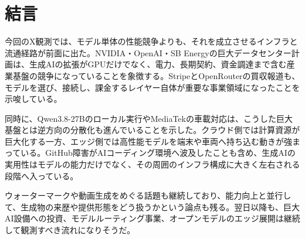 \section{結言}
今回のX観測では、モデル単体の性能競争よりも、それを成立させるインフラと流通経路が前面に出た。NVIDIA・OpenAI・SB Energyの巨大データセンター計画は、生成AIの拡張がGPUだけでなく、電力、長期契約、資金調達まで含む産業基盤の競争になっていることを象徴する。StripeとOpenRouterの買収報道も、モデルを選び、接続し、課金するレイヤー自体が重要な事業領域になったことを示唆している。

同時に、Qwen3.8-27Bのローカル実行やMediaTekの車載対応は、こうした巨大基盤とは逆方向の分散化も進んでいることを示した。クラウド側では計算資源が巨大化する一方、エッジ側では高性能モデルを端末や車両へ持ち込む動きが強まっている。GitHub障害がAIコーディング環境へ波及したことも含め、生成AIの実用性はモデルの能力だけでなく、その周囲のインフラ構成に大きく左右される段階へ入っている。

ウォーターマークや動画生成をめぐる話題も継続しており、能力向上と並行して、生成物の来歴や提供形態をどう扱うかという論点も残る。翌日以降も、巨大AI設備への投資、モデルルーティング事業、オープンモデルのエッジ展開は継続して観測すべき流れになりそうだ。
